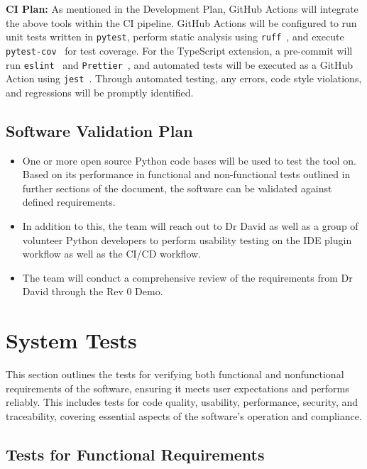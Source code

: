 \documentclass[12pt, titlepage]{article}
\begin{document}
\noindent\textbf{CI Plan:} As mentioned in the Development Plan,
GitHub Actions will integrate the above tools within the CI pipeline.
GitHub Actions will be configured to run unit tests written in
\texttt{pytest}, perform static analysis using
\texttt{ruff}~\cite{ruff}, and execute
\texttt{pytest-cov}~\cite{pytest-cov} for test coverage. For the
TypeScript extension, a pre-commit will run
\texttt{eslint}~\cite{eslint} and \texttt{Prettier}~\cite{prettier},
and automated tests will be executed as a GitHub Action using
\texttt{jest}~\cite{jest}. Through automated testing, any errors,
code style violations, and regressions will be promptly identified.\\

\subsection{Software Validation Plan}

\begin{itemize}
  \item One or more open source Python code bases will be used to
    test the tool on. Based on its performance in functional and
    non-functional tests outlined in further sections of the
    document, the software can be validated against defined requirements.
  \item In addition to this, the team will reach out to Dr David as
    well as a group of volunteer Python developers to perform
    usability testing on the IDE plugin workflow as well as the CI/CD workflow.
  \item The team will conduct a comprehensive review of the
    requirements from Dr David through the Rev 0 Demo.
\end{itemize}

\section{System Tests}

This section outlines the tests for verifying both functional and
nonfunctional requirements of the software, ensuring it meets user
expectations and performs reliably. This includes tests for code
quality, usability, performance, security, and traceability, covering
essential aspects of the software’s operation and compliance.

\subsection{Tests for Functional Requirements}
\end{document}
